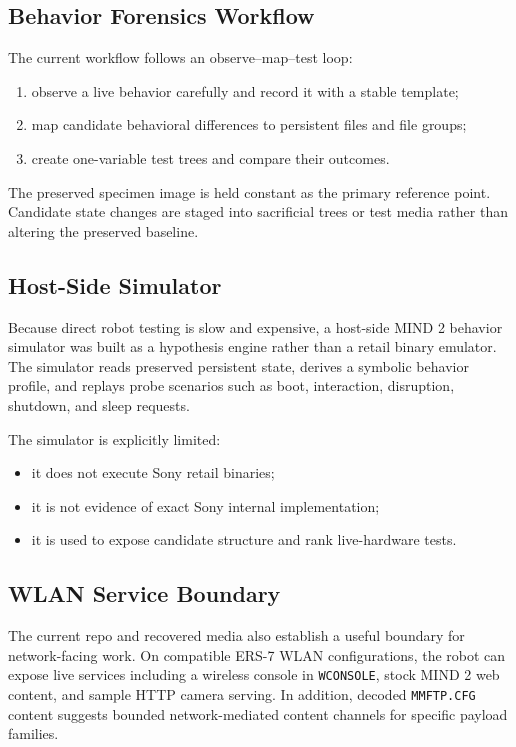\documentclass[11pt]{article}
\begin{document}
\subsection{Behavior Forensics Workflow}
The current workflow follows an observe--map--test loop:
\begin{enumerate}[leftmargin=*]
\item observe a live behavior carefully and record it with a stable template;
\item map candidate behavioral differences to persistent files and file groups;
\item create one-variable test trees and compare their outcomes.
\end{enumerate}

The preserved specimen image is held constant as the primary reference point.
Candidate state changes are staged into sacrificial trees or test media rather
than altering the preserved baseline.

\subsection{Host-Side Simulator}
Because direct robot testing is slow and expensive, a host-side MIND 2
behavior simulator was built as a hypothesis engine rather than a retail
binary emulator. The simulator reads preserved persistent state, derives a
symbolic behavior profile, and replays probe scenarios such as boot,
interaction, disruption, shutdown, and sleep requests.

The simulator is explicitly limited:
\begin{itemize}[leftmargin=*]
\item it does not execute Sony retail binaries;
\item it is not evidence of exact Sony internal implementation;
\item it is used to expose candidate structure and rank live-hardware tests.
\end{itemize}

\subsection{WLAN Service Boundary}
The current repo and recovered media also establish a useful boundary for
network-facing work. On compatible ERS-7 WLAN configurations, the robot can
expose live services including a wireless console in \texttt{WCONSOLE}, stock
MIND 2 web content, and sample HTTP camera serving. In addition, decoded
\texttt{MMFTP.CFG} content suggests bounded network-mediated content channels
for specific payload families.
\end{document}
